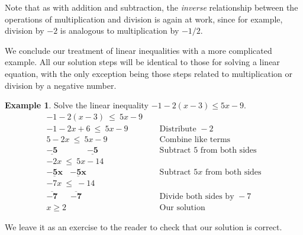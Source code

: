 \documentclass[12pt]{book}
\theoremstyle{definition}
\newtheorem{example}{Example}
\newcommand{\tmmathbf}[1]{\ensuremath{\boldsymbol{#1}}}
\begin{document}
\begin{center}
\end{center}
Note that as with addition and subtraction, the \textit{inverse} relationship between the operations of multiplication and division is again at work, since for example, division by $-2$ is analogous to multiplication by $-1/2$.\par
We conclude our treatment of linear inequalities with a more complicated example.  All our solution steps will be identical to those for solving a linear equation, with the only exception being those steps related to multiplication or division by a negative number.\par
\begin{example}\label{Lin96} Solve the linear inequality  $-1-2(x-3)\leq 5x-9$. 
\begin{eqnarray*}
-1-2(x-3)~\leq~ 5x-9~~ && \\
-1-2x+6~\leq~ 5x-9~~ && \text{Distribute~} -2\\
5-2x~\leq~ 5x-9~~ && \text{Combine~like~terms}\\
\tmmathbf{\underline{-5}~~~~~~~~~~~~~~~~\underline{-5}}~~ &&  \text{Subtract~} 5 \text{~from~both~sides}\\
-2x~\leq~ 5x-14 && \\
\tmmathbf{\underline{-5x}~~~~\underline{-5x}}~~~~~ && \text{Subtract~} 5x \text{~from~both~sides} \\
-7x~\leq~ -14~~~~~ && \\
\tmmathbf{\overline{-7}~~~~~~~\overline{-7}}~~~~~&& \text{Divide~both~sides~by~} -7\\
x\geq 2~~~~~~~~~ && \text{Our~solution}
\end{eqnarray*}
\end{example}
We leave it as an exercise to the reader to check that our solution is correct. 
\end{document}
